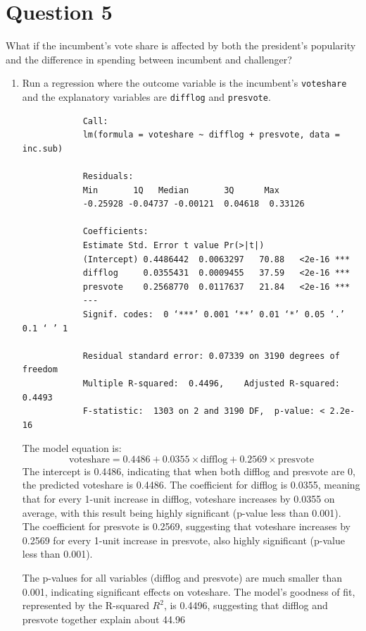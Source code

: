 \documentclass[12pt,letterpaper]{article}
\begin{document}
\section*{Question 5}
\noindent What if the incumbent's vote share is affected by both the president's popularity and the difference in spending between incumbent and challenger? 
	\begin{enumerate}
		\item Run a regression where the outcome variable is the incumbent's \texttt{voteshare} and the explanatory variables are \texttt{difflog} and \texttt{presvote}.	
		  
		\begin{verbatim}
			Call:
			lm(formula = voteshare ~ difflog + presvote, data = inc.sub)
			
			Residuals:
			Min       1Q   Median       3Q      Max 
			-0.25928 -0.04737 -0.00121  0.04618  0.33126 
			
			Coefficients:
			Estimate Std. Error t value Pr(>|t|)    
			(Intercept) 0.4486442  0.0063297   70.88   <2e-16 ***
			difflog     0.0355431  0.0009455   37.59   <2e-16 ***
			presvote    0.2568770  0.0117637   21.84   <2e-16 ***
			---
			Signif. codes:  0 ‘***’ 0.001 ‘**’ 0.01 ‘*’ 0.05 ‘.’ 0.1 ‘ ’ 1
			
			Residual standard error: 0.07339 on 3190 degrees of freedom
			Multiple R-squared:  0.4496,	Adjusted R-squared:  0.4493 
			F-statistic:  1303 on 2 and 3190 DF,  p-value: < 2.2e-16
		\end{verbatim} 
		  
		The model equation is:
		\[
		\text{voteshare} = 0.4486 + 0.0355 \times \text{difflog} + 0.2569 \times \text{presvote}
		\]
		The intercept is 0.4486, indicating that when both difflog and presvote are 0, the predicted voteshare is 0.4486. The coefficient for difflog is 0.0355, meaning that for every 1-unit increase in difflog, voteshare increases by 0.0355 on average, with this result being highly significant (p-value less than 0.001). The coefficient for presvote is 0.2569, suggesting that voteshare increases by 0.2569 for every 1-unit increase in presvote, also highly significant (p-value less than 0.001).
		
		The p-values for all variables (difflog and presvote) are much smaller than 0.001, indicating significant effects on voteshare. The model's goodness of fit, represented by the R-squared \( R^2 \), is 0.4496, suggesting that difflog and presvote together explain about 44.96%
		

\end{enumerate}
\end{document}
